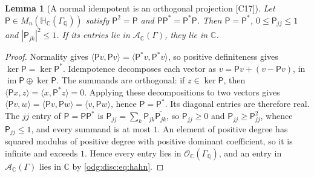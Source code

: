 \documentclass[11pt,oneside]{article}
\numberwithin{equation}{section}
\newtheorem{lemma}[lemma]{Lemma}
\theoremstyle{definition}
\theoremstyle{remark}
\newcommand{\Q}{\mathbb Q}
\newcommand{\C}{\mathbb C}
\newcommand{\src}[1]{\textup{\textsf{\small[#1]}}}
\begin{document}
\begin{lemma}[A normal idempotent is an orthogonal projection \src{C17}]\label{odg:disc:lem:projection}
Let $\mathsf P\in M_n(\mathbb H_\C(\Gamma_\Q))$ satisfy $\mathsf P^2=\mathsf P$ and
$\mathsf P\mathsf P^*=\mathsf P^*\mathsf P$. Then $\mathsf P=\mathsf P^*$,
$0\le\mathsf P_{jj}\le1$ and $|\mathsf P_{jk}|^2\le1$. If its entries lie in
$\mathcal A_\C(\Gamma)$, they lie in $\C$.
\end{lemma}
\begin{proof}
Normality gives $\langle\mathsf Pv,\mathsf Pv\rangle=\langle\mathsf P^*v,\mathsf P^*v\rangle$,
so positive definiteness gives $\ker\mathsf P=\ker\mathsf P^*$. Idempotence decomposes
each vector as $v=\mathsf Pv+(v-\mathsf Pv)$, in
$\operatorname{im}\mathsf P\oplus\ker\mathsf P$. The summands are orthogonal: if
$z\in\ker\mathsf P$, then $\langle\mathsf Px,z\rangle=\langle x,\mathsf P^*z\rangle=0$.
Applying these decompositions to two vectors gives
$\langle\mathsf Pv,w\rangle=\langle\mathsf Pv,\mathsf Pw\rangle=
\langle v,\mathsf Pw\rangle$, hence $\mathsf P=\mathsf P^*$.
Its diagonal entries are therefore real. The $jj$ entry of
$\mathsf P=\mathsf P\mathsf P^*$ is $\mathsf P_{jj}=\sum_k\mathsf P_{jk}\overline{\mathsf
P_{jk}}$, so $\mathsf P_{jj}\ge0$ and $\mathsf P_{jj}\ge\mathsf P_{jj}^2$, whence
$\mathsf P_{jj}\le1$, and every summand is at most $1$. An element of positive degree has
squared modulus of positive degree with positive dominant coefficient, so it is infinite and
exceeds $1$. Hence every entry lies in $\mathcal O_\C(\Gamma_\Q)$, and an entry in
$\mathcal A_\C(\Gamma)$ lies in $\C$ by \eqref{odg:disc:eq:hahn}.
\end{proof}
\end{document}

